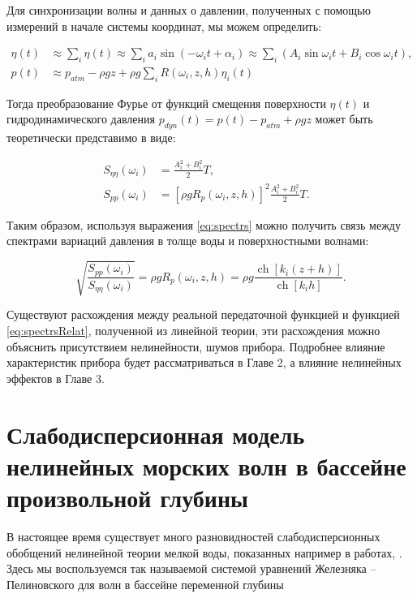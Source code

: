 Для синхронизации волны и данных о давлении, полученных с помощью измерений в начале системы координат, мы можем определить:

\begin{align}\label{eq:longeHigg}
\eta(t)&\approx\sum\limits_i\eta(t)\approx\sum\limits_ia_i\sin(-\omega_it+\alpha_i)\approx
\sum\limits_i(A_i\sin\omega_it+B_i\cos\omega_it),&\\
p(t)&\approx p_{atm}-\rho gz+\rho g\sum\limits_iR(\omega_i,z,h)\eta_i(t)
\end{align}

Тогда преобразование Фурье от функций смещения поверхности $\eta(t)$  и гидродинамического давления $p_{dyn}(t)=p(t)-p_{atm}+\rho gz$ может быть теоретически представимо \cite{Huang_Tsai_2008} в виде:

\begin{align}\label{eq:spectrs}
S_{\eta\eta}(\omega_i)&=\frac{A_i^2+B_i^2}{2}T,&\\
S_{pp}(\omega_i)&=[\rho gR_p(\omega_i,z,h)]^2\frac{A_i^2+B_i^2}{2}T.&
\end{align}

Таким образом, используя выражения \eqref{eq:spectrs} можно получить связь между спектрами вариаций давления в толще воды и поверхностными волнами:

\begin{equation}\label{eq:spectrsRelat}
  \sqrt{\frac{S_{pp}(\omega_i)}{S_{\eta\eta}(\omega_i)}}=\rho gR_p(\omega_i,z,h)=\rho g\frac{\operatorname{ch}[k_i(z+h)]}{\operatorname{ch}[k_ih]}.
\end{equation}
\noindent

Существуют расхождения между реальной передаточной функцией и функцией \eqref{eq:spectrsRelat}, полученной из линейной теории, эти расхождения можно объяснить присутствием нелинейности, шумов прибора. Подробнее влияние характеристик прибора будет рассматриваться в Главе 2, а влияние нелинейных эффектов в Главе 3.

\section{Слабодисперсионная модель нелинейных морских волн в бассейне произвольной глубины }
В настоящее время существует много разновидностей слабодисперсионных обобщений нелинейной теории мелкой воды, показанных например в работах, \cite{Green_1976}\cite{Zhel_1985} \cite{Fedotova_2008} \cite{Fedotova_2012}. Здесь мы воспользуемся так называемой системой уравнений Железняка -- Пелиновского для волн в бассейне переменной глубины \cite{Zhel_Pel_1985}

